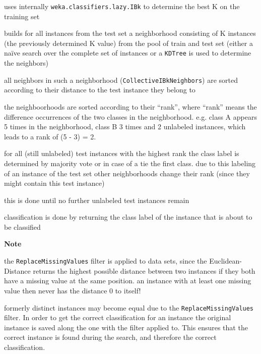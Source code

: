 \documentclass[a4paper]{book}
\begin{document}
\begin{tight_itemize}
	\item uses internally \texttt{weka.classifiers.lazy.IBk} to determine the 
	best K on the training set
	\item builds for all instances from the test set a neighborhood consisting 
	of K instances (the previously determined K value) from the pool of train 
	and test set (either a naïve search over the complete set of instances or 
	a \texttt{KDTree} is used to determine the neighbors)
	\item all neighbors in such a neighborhood (\texttt{CollectiveIBkNeighbors}) 
	are sorted according to their distance to the test instance they belong to
	\item the neighboorhoods are sorted according to their ``rank'', where 
	``rank'' means the difference occurrences of the two classes in the 
	neighborhood. e.g. class A appears 5 times in the neighborhood, class B 3 
	times and 2 unlabeled instances, which leads to a rank of (5 - 3) = 2.
	\item for all (still unlabeled) test instances with the highest rank the 
	class label is determined by majority vote or in case of a tie the first 
	class. due to this labeling of an instance of the test set other neighborhoods 
	change their rank (since they might contain this test instance)
	\item this is done until no further unlabeled test instances remain
	\item classification is done by returning the class label of the instance 
	that is about to be classified
\end{tight_itemize}
\textbf{Note}
\begin{tight_itemize}
	\item the \texttt{ReplaceMissingValues} filter is applied to data sets, 
	since the Euclidean-Distance returns the highest possible distance between 
	two instances if they both have a missing value at the same position. an 
	instance with at least one missing value then never has the distance 0 to itself!
	\item formerly distinct instances may become equal due to the 
	\texttt{ReplaceMissingValues} filter. In order to get the correct 
	classification for an instance the original instance is saved along the one 
	with the filter applied to. This ensures that the correct instance is 
	found during the search, and therefore the correct classification.
\end{tight_itemize}
\end{document}
